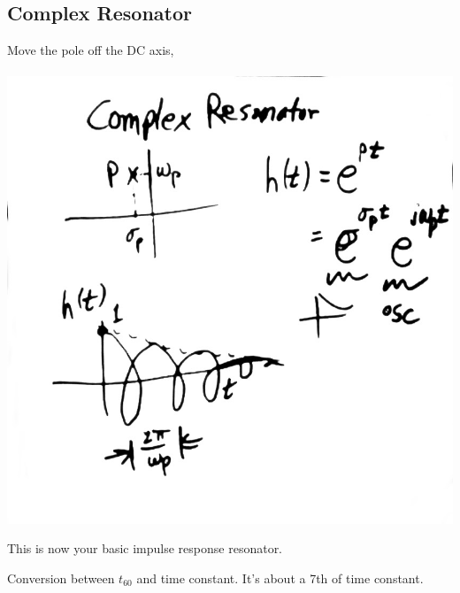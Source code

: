 \subsection*{Complex Resonator}
Move the pole off the DC axis, \\
\\
\includegraphics[scale=0.3]{photos/jan26/11g}

This is now your basic impulse response resonator. 

Conversion between $t_{60}$ and time constant. It's about a 7th of time constant.
 

